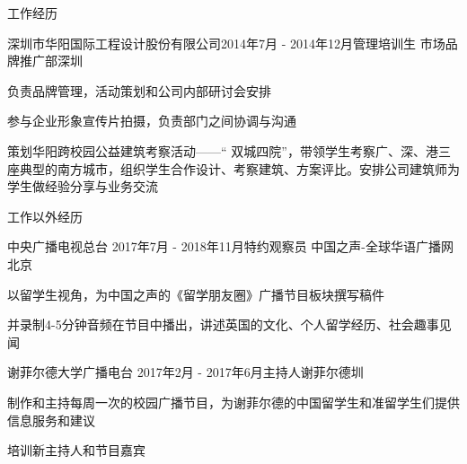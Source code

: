 \documentclass{resume} %
\begin{document}
\begin{rSection}{工作经历}

\begin{rSubsection}{深圳市华阳国际工程设计股份有限公司}{2014年7月 - 2014年12月}{管理培训生 市场品牌推广部}{深圳}
\item 负责品牌管理，活动策划和公司内部研讨会安排
\item 参与企业形象宣传片拍摄，负责部门之间协调与沟通
\item 策划华阳跨校园公益建筑考察活动——“ 双城四院”，带领学生考察广、深、港三座典型的南方城市，组织学生合作设计、考察建筑、方案评比。安排公司建筑师为学生做经验分享与业务交流
\end{rSubsection}

\end{rSection}


\begin{rSection}{工作以外经历}

\begin{rSubsection}{中央广播电视总台 }{2017年7月 - 2018年11月}{特约观察员 中国之声-全球华语广播网}{北京}
	\item 以留学生视角，为中国之声的《留学朋友圈》广播节目板块撰写稿件
	\item 并录制4-5分钟音频在节目中播出，讲述英国的文化、个人留学经历、社会趣事见闻
\end{rSubsection}


\begin{rSubsection}{谢菲尔德大学广播电台 }{2017年2月 - 2017年6月}{主持人}{谢菲尔德圳}
	\item 制作和主持每周一次的校园广播节目，为谢菲尔德的中国留学生和准留学生们提供信息服务和建议
	\item 培训新主持人和节目嘉宾
\end{rSubsection}

\end{rSection}

\end{document}
